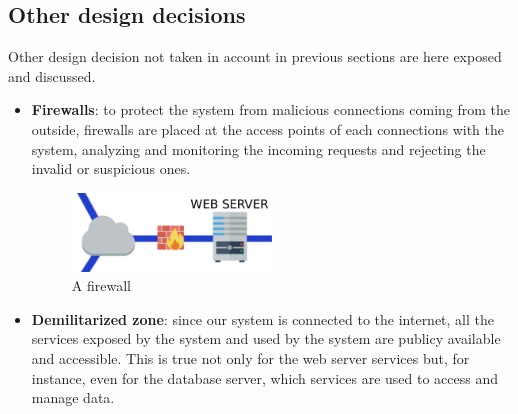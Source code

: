 \subsection{Other design decisions}

\label{sec:other-design-decisions}

Other design decision not taken in account in previous sections are here exposed and discussed.

\begin{itemize}
	\item \textbf{Firewalls}: to protect the system from malicious connections coming from the outside, firewalls are placed at the access points of each connections with the system, analyzing and monitoring the incoming requests and rejecting the invalid or suspicious ones.
\begin{figure}[H]
	\centerline{
		\includegraphics[width=200px]{../Datas/images/firewall.pdf}
	}
	\caption{A firewall}
	\label{fig:firewall}
\end{figure}

	\item \textbf{Demilitarized zone}: since our system is connected to the internet, all the services exposed by the system and used by the system are publicy available and accessible. This is true not only for the web server services but, for instance, even for the database server, which services are used to access and manage data. 


\end{itemize}
